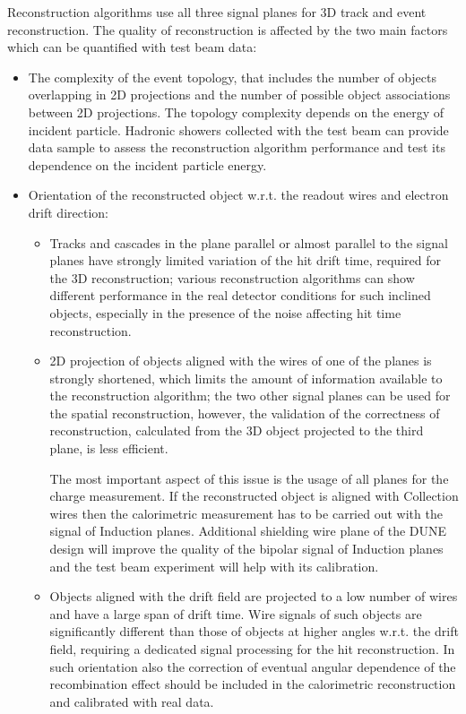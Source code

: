 Reconstruction algorithms use all three signal planes for 3D track and event reconstruction. The quality of reconstruction is affected by the two main factors which can be quantified with test beam data:
\begin{itemize}
\item The complexity of the event topology, that includes the number of objects overlapping in 2D projections and the number of possible object associations between 2D projections. The topology complexity depends on the energy of incident particle. Hadronic showers collected with the test beam can provide data sample to assess the reconstruction algorithm performance and test its dependence on the incident particle energy.
\item Orientation of the reconstructed object w.r.t. the readout wires and electron drift direction:
\begin{itemize}
\item Tracks and cascades in the plane parallel or almost parallel to the signal planes have strongly limited variation of the hit drift time, required for the 3D reconstruction; various reconstruction algorithms can show different performance in the real detector conditions for such inclined objects, especially in the presence of the noise affecting hit time reconstruction.
\item 2D projection of objects aligned with the wires of one of the planes is strongly shortened, which limits the amount of information available to the reconstruction algorithm; the two other signal planes can be used for the spatial reconstruction, however, the validation of the correctness of reconstruction, calculated from the 3D object projected to the third plane, is less efficient.

The most important aspect of this issue is the usage of all planes for the charge measurement. If the reconstructed object is aligned with Collection wires then the calorimetric measurement has to be carried out with the signal of Induction planes. Additional shielding wire plane of the DUNE design will improve the quality of the bipolar signal of Induction planes and the test beam experiment will help with its calibration.
\item Objects aligned with the drift field are projected to a low number of wires and have a large span of drift time. Wire signals of such objects are significantly different than those of objects at higher angles w.r.t. the drift field, requiring a dedicated signal processing for the hit reconstruction. In such orientation also the correction of eventual angular dependence of the recombination effect should be included in the calorimetric reconstruction and calibrated with real data.
\end{itemize}
\end{itemize}

